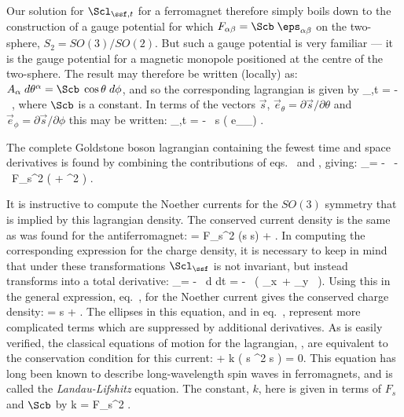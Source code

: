 \documentclass[12pt]{report}
\begin{document}
Our solution for $\Scl_{\ssf,t}$ for a ferromagnet
therefore simply boils down to the construction of a gauge
potential for which $F_{\alpha\beta} = \Scb \;
\eps_{\alpha\beta}$ on the two-sphere, $S_2 = SO(3)/SO(2)$.
But such a gauge potential is very familiar --- it is the
gauge potential for a magnetic monopole positioned at the
centre of the two-sphere. The result may therefore be
written (locally) as: $A_\alpha \; d\theta^\alpha = \Scb \;
\cos\theta \; 
d\phi$, and so the corresponding lagrangian is given by
%
\eq
\label{ftimeterms}
\Scl_{\ssf,t} = - \, \Scb \; \cos\theta \; \dot\phi, \eeq
%
where $\Scb$ is a constant. In terms of the vectors $\vec
s$, 
$\vec e_\theta = \partial \vec s / \partial \theta$ and
$\vec e_\phi = \partial \vec s / \partial \phi$ this may be
written:
%
\eq
\label{fancyftimeterms}
\Scl_{\ssf,t} = - \, \Scb \; \vec s 
\cdot \Bigl( \vec e_\theta \times {}_\theta \Bigr) .
\eeq

The complete Goldstone boson lagrangian containing the
fewest time and space derivatives is found by combining the
contributions of eqs.~ and
, giving:
%
\eq
\label{ftotalterms}
\Scl_\ssf = - \, \Scb \; \cos\theta \; 
\dot\phi - \, {F_s^2 } \; \Bigl(
\del\theta \cdot \del \theta + \sin^2 
\theta \; \del \phi \cdot \del \phi
\Bigr) .
\eeq

It is instructive to compute the Noether currents for the
$SO(3)$ symmetry that is implied by this lagrangian
density. The conserved current density is the same as was
found for the antiferromagnet:
\eq
\label{conscurrentdens}
\vec\bfj = F_s^2 \; (\vec s \times 
\del \vec s) + \cdots . \eeq
%
In computing the corresponding expression for the charge
density, it is necessary to keep in mind that under these
transformations 
$\Scl_\ssf$ is not invariant, but instead transforms into a
total derivative:   
%
\eq
\label{totderivvariationofl}
\delta \Scl_\ssf = - \, {d \Omega \over dt} 
= - \, { \Scb \over \sin \theta} \;
\Bigl( \omega_x \,\cos\phi + \omega_y 
\, \sin\phi \Bigr). \eeq
%
Using this in the general expression, eq.~,
for the Noether current gives the conserved charge density: 
%
\eq
\label{conschargedensityforfm}
\vec \rho = \Scb \; \vec s + \cdots .
\eeq
%
The ellipses in this equation, and in
eq.~, represent more complicated
terms which are suppressed by additional derivatives. As is
easily verified, the classical equations of motion for the
lagrangian, , are equivalent to the
conservation condition for this current:
%
\eq
\label{landaulifshitzeq}
 + k \; \Bigl( \vec s \times 
\del^2 \vec s \Bigr) = 0.
\eeq
%
This equation has long been known to describe
long-wavelength spin waves in ferromagnets, and is called
the {\em Landau-Lifshitz} equation. The constant, $k$, here
is given in terms of $F_s$ and $\Scb$ by 
%
\eq
\label{lleqconst}
k = {F_s^2 \over \Scb}.
\eeq
\end{document}
